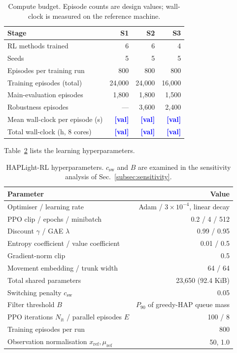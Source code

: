 \documentclass[journal]{IEEEtran}
\newcommand{\pl}{\textcolor{blue}{\textbf{[val]}}}
\begin{document}
\begin{table}[htbp]
\caption{Compute budget. Episode counts are design values; wall-clock is
measured on the reference machine.}
\label{tab:budget}
\centering
\footnotesize
\begin{tabularx}{\columnwidth}{@{}Xrrr@{}}
\toprule
Stage & S1 & S2 & S3 \\
\midrule
RL methods trained            & 6      & 6      & 4 \\
Seeds                         & 5      & 5      & 5 \\
Episodes per training run     & 800    & 800    & 800 \\
Training episodes (total)     & 24{,}000 & 24{,}000 & 16{,}000 \\
Main-evaluation episodes      & 1{,}800  & 1{,}800  & 1{,}500 \\
Robustness episodes           & ---      & 3{,}600  & 2{,}400 \\
\midrule
Mean wall-clock per episode (s) & \pl & \pl & \pl \\
Total wall-clock (h, 8 cores)   & \pl & \pl & \pl \\
\bottomrule
\end{tabularx}
\end{table}

Table~\ref{tab:hyper} lists the learning hyperparameters.

\begin{table}[htbp]
\caption{HAPLight-RL hyperparameters. $c_{\mathrm{sw}}$ and $B$ are
examined in the sensitivity analysis of Sec.~\ref{subsec:sensitivity}.}
\label{tab:hyper}
\centering
\footnotesize
\begin{tabularx}{\columnwidth}{@{}Xr@{}}
\toprule
Parameter & Value \\
\midrule
Optimiser / learning rate & Adam / $3\times10^{-4}$, linear decay \\
PPO clip / epochs / minibatch & 0.2 / 4 / 512 \\
Discount $\gamma$ / GAE $\lambda$ & 0.99 / 0.95 \\
Entropy coefficient / value coefficient & 0.01 / 0.5 \\
Gradient-norm clip & 0.5 \\
Movement embedding / trunk width & 64 / 64 \\
Total shared parameters & 23{,}650 (92.4 KiB) \\
Switching penalty $c_{\mathrm{sw}}$ & 0.05 \\
Filter threshold $B$ & $P_{90}$ of greedy-HAP queue mass \\
PPO iterations $N_{\mathrm{it}}$ / parallel episodes $E$ & 100 / 8 \\
Training episodes per run & 800 \\
Observation normalisation $x_{\mathrm{ref}},\mu_{\mathrm{ref}}$ & 50, 1.0 \\
\bottomrule
\end{tabularx}
\end{table}
\end{document}
